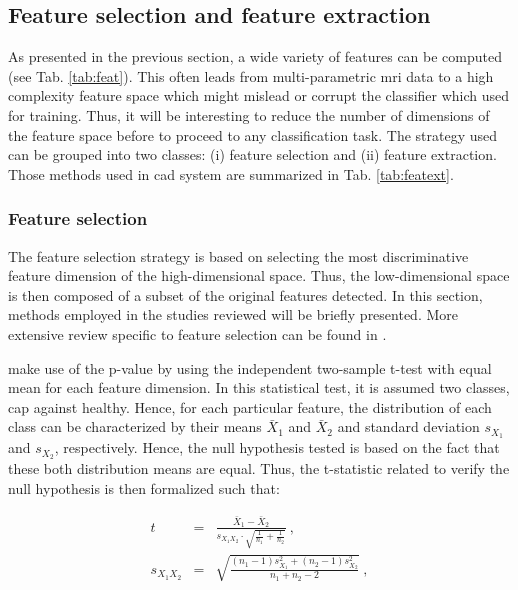 \subsection{Feature selection and feature extraction} \label{subsec:featureselectionextraction}

As presented in the previous section, a wide variety of features can be computed (see Tab. \ref{tab:feat}). This often leads from multi-parametric \ac{mri} data to a high complexity feature space which might mislead or corrupt the classifier which used for training. Thus, it will be interesting to reduce the number of dimensions of the feature space before to proceed to any classification task. The strategy used can be grouped into two classes: (i) feature selection and (ii) feature extraction. Those methods used in \ac{cad} system are summarized in Tab. \ref{tab:featext}.

\subsubsection{Feature selection}\label{subsubsec:featsel}

The feature selection strategy is based on selecting the most discriminative feature dimension of the high-dimensional space. Thus, the low-dimensional space is then composed of a subset of the original features detected. In this section, methods employed in the studies reviewed will be briefly presented. More extensive review specific to feature selection can be found in \cite{Saeys2007}.

\cite{Niaf2011,Niaf2012} make use of the p-value by using the independent two-sample t-test with equal mean for each feature dimension. In this statistical test, it is assumed two classes, \ac{cap} against healthy. Hence, for each particular feature, the distribution of each class can be characterized by their means $\bar{X}_1$ and $\bar{X}_2$ and standard deviation $s_{X_1}$ and $s_{X_2}$, respectively. Hence, the null hypothesis tested is based on the fact that these both distribution means are equal. Thus, the t-statistic related to verify the null hypothesis is then formalized such that:

\begin{eqnarray}
t & = & \frac{\bar {X}_1 - \bar{X}_2}{s_{X_1X_2} \cdot \sqrt{\frac{1}{n_1}+\frac{1}{n_2}}} \ , \label{eq:tstat} \\
s_{X_1X_2} & = & \sqrt{\frac{(n_1-1)s_{X_1}^2+(n_2-1)s_{X_2}^2}{n_1+n_2-2}} \ , \nonumber
\end{eqnarray}

